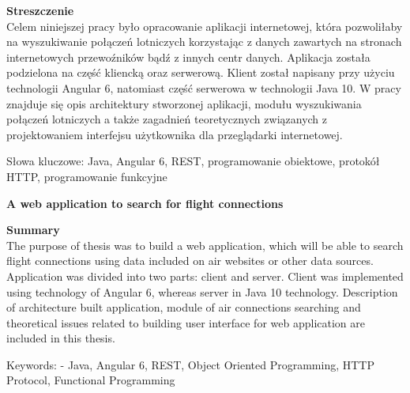\documentclass[12pt, twoside]{report}
\newcommand\tab[1][0.5cm]{\hspace*{#1}}
\newcommand\blankpage{%
	\null
    \thispagestyle{empty}%
    \newpage}
\begin{document}
\begin{flushleft}
	{\fontsize{14pt}{12pt}\selectfont
		\textbf{Streszczenie}}\\
	\vspace{1cm}
\tab Celem niniejszej pracy było opracowanie aplikacji internetowej, która pozwoliłaby na wyszukiwanie połączeń lotniczych korzystając z danych zawartych na stronach internetowych przewoźników bądź z innych centr danych. Aplikacja została podzielona na część kliencką oraz serwerową. Klient został napisany przy użyciu technologii Angular 6, natomiast część serwerowa w technologii Java 10. W pracy znajduje się opis architektury stworzonej aplikacji, modułu wyszukiwania połączeń lotniczych a także zagadnień teoretycznych związanych z projektowaniem interfejsu użytkownika dla przeglądarki internetowej.
\end{flushleft}
\vspace{0.5cm}
Słowa kluczowe: Java, Angular 6, REST, programowanie obiektowe, protokół HTTP, programowanie funkcyjne

\vspace{1.5cm}

\begin{center}
	{\fontsize{14pt}{12pt}\selectfont
		\textbf{A web application to search for flight connections}}
\end{center}

\begin{flushleft}
	{\fontsize{14pt}{12pt}\selectfont
		\textbf{Summary}}\\
	\vspace{1cm}
\tab The purpose of thesis was to build a web application, which will be able to search flight connections using data included on air websites or other data sources. Application was divided into two parts: client and server. Client was implemented using technology of Angular 6, whereas server in Java 10 technology. Description of architecture built application, module of air connections searching and theoretical issues related to building user interface for web application are included in this thesis. 
\end{flushleft}
\vspace{0.5cm}
Keywords: - Java, Angular 6, REST, Object Oriented Programming, HTTP Protocol, Functional Programming
\afterpage{\blankpage}


\renewcommand{\contentsname}{Spis treści}
\newpage
{}
\setcounter{page}{9}
\tableofcontents

\newpage
\end{document}
